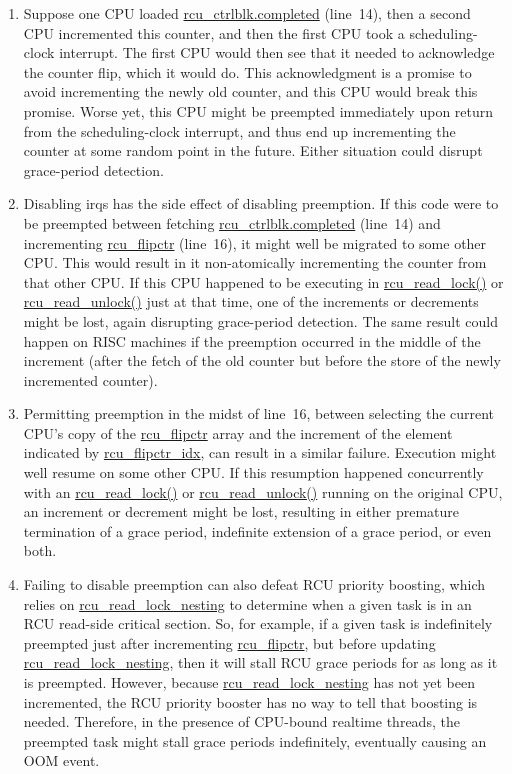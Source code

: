 \begin{enumerate}
\item	Suppose one CPU loaded \url{rcu_ctrlblk.completed}
	(line~14), then a second CPU incremented this counter,
	and then the first CPU took a scheduling-clock interrupt.
	The first CPU would then see that it needed to acknowledge
	the counter flip, which it would do.
	This acknowledgment is a promise to avoid incrementing
	the newly old counter, and this CPU would break this
	promise.
	Worse yet, this CPU might be preempted immediately upon
	return from the scheduling-clock interrupt, and thus
	end up incrementing the counter at some random point
	in the future.
	Either situation could disrupt grace-period detection.
\item	Disabling irqs has the side effect of disabling preemption.
	If this code were to be preempted between fetching
	\url{rcu_ctrlblk.completed} (line~14) and
	incrementing \url{rcu_flipctr} (line~16),
	it might well be migrated to some other CPU.
	This would result in it non-atomically incrementing
	the counter from that other CPU.
	If this CPU happened to be executing in \url{rcu_read_lock()}
	or \url{rcu_read_unlock()} just at that time, one
	of the increments or decrements might be lost, again
	disrupting grace-period detection.
	The same result could happen on RISC machines if the preemption
	occurred in the middle of the increment (after the fetch of
	the old counter but before the store of the newly incremented
	counter).
\item	Permitting preemption in the midst
	of line~16, between selecting the current CPU's copy
	of the \url{rcu_flipctr} array and the increment of
	the element indicated by \url{rcu_flipctr_idx}, can
	result in a similar failure.
	Execution might well resume on some other CPU.
	If this resumption happened concurrently with an
	\url{rcu_read_lock()} or \url{rcu_read_unlock()}
	running on the original CPU,
	an increment or decrement might be lost, resulting in either
	premature termination of a grace period, indefinite extension
	of a grace period, or even both.
\item	Failing to disable preemption can also defeat RCU priority
	boosting, which relies on \url{rcu_read_lock_nesting}
	to determine when a given task is in an RCU read-side
	critical section.
	So, for example, if a given task is indefinitely
	preempted just after incrementing \url{rcu_flipctr},
	but before updating \url{rcu_read_lock_nesting},
	then it will stall RCU grace periods for as long as it
	is preempted.
	However, because \url{rcu_read_lock_nesting} has not
	yet been incremented, the RCU priority booster has no way
	to tell that boosting is needed.
	Therefore, in the presence of CPU-bound realtime threads,
	the preempted task might stall grace periods indefinitely,
	eventually causing an OOM event.
\end{enumerate}

